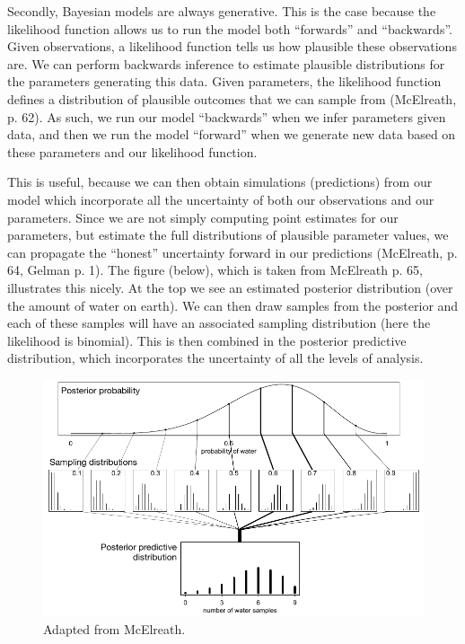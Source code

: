 \documentclass{article}
\begin{document}
Secondly, Bayesian models are always generative. This is the case because the likelihood function allows us to run the model both “forwards” and “backwards”. Given observations, a likelihood function tells us how plausible these observations are. We can perform backwards inference to estimate plausible distributions for the parameters generating this data.  Given parameters, the likelihood function defines a distribution of plausible outcomes that we can sample from (McElreath, p. 62). As such, we run our model “backwards” when we infer parameters given data, and then we run the model “forward” when we generate new data based on these parameters and our likelihood function.

This is useful, because we can then obtain simulations (predictions) from our model which incorporate all the uncertainty of both our observations and our parameters. Since we are not simply computing point estimates for our parameters, but estimate the full distributions of plausible parameter values, we can propagate the “honest” uncertainty forward in our predictions (McElreath, p. 64, Gelman p. 1). The figure (below), which is taken from McElreath p. 65, illustrates this nicely. At the top we see an estimated posterior distribution (over the amount of water on earth). We can then draw samples from the posterior and each of these samples will have an associated sampling distribution (here the likelihood is binomial). This is then combined in the posterior predictive distribution, which incorporates the uncertainty of all the levels of analysis.


\begin{figure}[H]
    \centerline{\includegraphics[scale = 0.5]{images/McElreath.png}}
    \caption{Adapted from McElreath.}
\end{figure}
\end{document}
